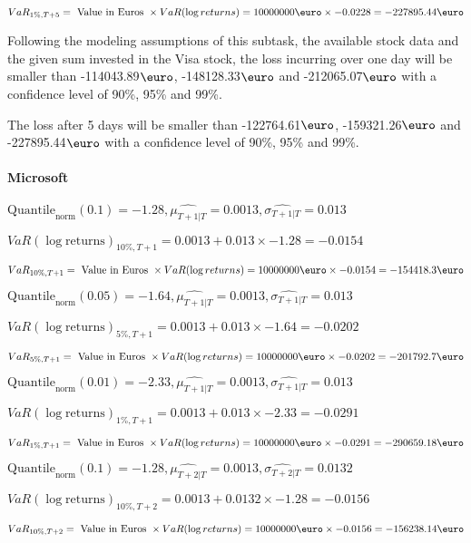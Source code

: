 $VaR_{1\%, T + 5} = \text{ Value in Euros } \times VaR(\log returns) = 10 000 000 \text{\euro} \times-0.0228 = -227895.44 \text{\euro}$


Following the modeling assumptions of this subtask, the available stock data and the given sum invested in the Visa stock, the loss incurring over one day will be smaller than -114043.89$\text{\euro}$, -148128.33$\text{\euro}$  and -212065.07$\text{\euro}$  with a confidence level of 90\%, 95\%  and 99\%.

The loss after 5 days will be smaller than -122764.61$\text{\euro}$, -159321.26$\text{\euro}$  and -227895.44$\text{\euro}$  with a confidence level of 90\%, 95\%  and 99\%.


\paragraph{Microsoft}


$\text{Quantile}_\text{norm}(0.1) = -1.28,\hat{\mu_{T+1|T}} = 0.0013, \hat{\sigma_{T+1|T}} = 0.013$

$VaR(\log \text{returns})_{10\%, T + 1} = 0.0013 + 0.013\times-1.28 = -0.0154$

$VaR_{10\%, T + 1} = \text{ Value in Euros } \times VaR(\log returns) = 10 000 000 \text{\euro} \times-0.0154 = -154418.3 \text{\euro}$


$\text{Quantile}_\text{norm}(0.05) = -1.64,\hat{\mu_{T+1|T}} = 0.0013, \hat{\sigma_{T+1|T}} = 0.013$

$VaR(\log \text{returns})_{5\%, T + 1} = 0.0013 + 0.013\times-1.64 = -0.0202$

$VaR_{5\%, T + 1} = \text{ Value in Euros } \times VaR(\log returns) = 10 000 000 \text{\euro} \times-0.0202 = -201792.7 \text{\euro}$


$\text{Quantile}_\text{norm}(0.01) = -2.33,\hat{\mu_{T+1|T}} = 0.0013, \hat{\sigma_{T+1|T}} = 0.013$

$VaR(\log \text{returns})_{1\%, T + 1} = 0.0013 + 0.013\times-2.33 = -0.0291$

$VaR_{1\%, T + 1} = \text{ Value in Euros } \times VaR(\log returns) = 10 000 000 \text{\euro} \times-0.0291 = -290659.18 \text{\euro}$


$\text{Quantile}_\text{norm}(0.1) = -1.28,\hat{\mu_{T+2|T}} = 0.0013, \hat{\sigma_{T+2|T}} = 0.0132$

$VaR(\log \text{returns})_{10\%, T + 2} = 0.0013 + 0.0132\times-1.28 = -0.0156$

$VaR_{10\%, T + 2} = \text{ Value in Euros } \times VaR(\log returns) = 10 000 000 \text{\euro} \times-0.0156 = -156238.14 \text{\euro}$


